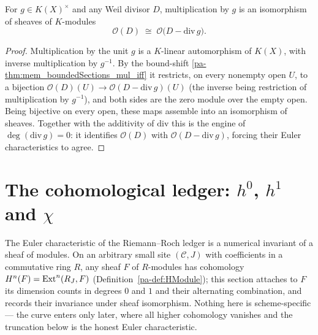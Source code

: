 \begin{theorem}
  \label{pa-thm:mulEquivDivisorSheaf}
  \leanok

  For \(g \in K(X)^\times\) and any Weil divisor \(D\), multiplication by \(g\) is an isomorphism of
  sheaves of \(K\)-modules
  \[
    \mathcal O(D) \;\cong\; \mathcal O\bigl(D - \mathrm{div}\, g\bigr).
  \]
\end{theorem}
\begin{proof}
  \leanok
  Multiplication by the unit \(g\) is a \(K\)-linear automorphism of \(K(X)\), with inverse
  multiplication by \(g^{-1}\). By the bound-shift \ref{pa-thm:mem_boundedSections_mul_iff} it
  restricts, on every nonempty open \(U\), to a bijection \(\mathcal O(D)(U) \to
  \mathcal O(D - \mathrm{div}\, g)(U)\) (the inverse being restriction of multiplication by
  \(g^{-1}\)), and both sides are the zero module over the empty open. Being bijective on every
  open, these maps assemble into an isomorphism of sheaves. Together with the additivity of
  \(\mathrm{div}\) this is the engine of \(\deg(\mathrm{div}\, g) = 0\): it identifies
  \(\mathcal O(D)\) with \(\mathcal O(D - \mathrm{div}\, g)\), forcing their Euler characteristics to
  agree.
\end{proof}

\section{The cohomological ledger:
  \texorpdfstring{\(h^0\), \(h^1\) and \(\chi\)}{h0, h1 and chi}}

The Euler characteristic of the Riemann--Roch ledger is a numerical invariant of a sheaf of
modules. On an arbitrary small site \((\mathcal C, J)\) with coefficients in a commutative ring
\(R\), any sheaf \(F\) of \(R\)-modules has cohomology \(H^n(F) = \operatorname{Ext}^n(R_J, F)\)
(Definition~\ref{pa-def:HModule}); this section attaches to \(F\) its dimension counts in degrees
\(0\) and \(1\) and their alternating combination, and records their invariance under sheaf
isomorphism. Nothing here is scheme-specific --- the curve enters only later, where all higher
cohomology vanishes and the truncation below is the honest Euler characteristic.

